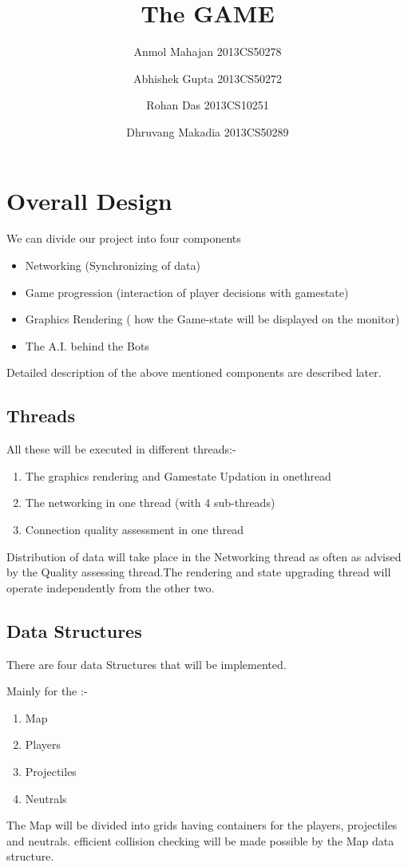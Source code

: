 \documentclass[ebook,12pt,oneside,openany]{article}
\title{The GAME}
\author{Anmol Mahajan 2013CS50278  \and Abhishek Gupta 2013CS50272 \and Rohan Das 2013CS10251	\and Dhruvang Makadia 2013CS50289}
\begin{document}
\maketitle

\cleardoublepage

\section{Overall Design}

We can divide our project into four components 
\begin{itemize}
\item Networking (Synchronizing of data)
\item Game progression (interaction of player decisions with gamestate)
\item Graphics Rendering ( how the Game-state will be displayed on the monitor)
\item The A.I. behind the Bots 
\end{itemize}

Detailed description of the above mentioned components are described later.
\subsection{Threads}
All these will be executed in different threads:-
\begin{enumerate}
\item The graphics rendering and Gamestate Updation in onethread
\item The networking in one thread (with 4 sub-threads)
\item Connection quality assessment in one thread
\end{enumerate}
Distribution of data will take place in the Networking thread as often as advised by the Quality assessing thread.The rendering and state upgrading thread will operate independently from the other two.
\subsection{Data Structures}
There are four data Structures that will be implemented.

Mainly for the :-
\begin{enumerate}
\item Map
\item Players
\item Projectiles
\item Neutrals
\end{enumerate}
The Map will be divided into grids having containers for the players, projectiles and neutrals.
efficient collision checking will be made possible by the Map data structure.
\end{document}
